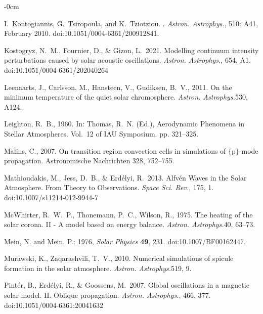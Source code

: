 \documentclass[physics,article,submit,pdftex,moreauthors]{Definitions/mdpi}
\newcommand{\aap}{{\it Astron. Astrophys.}}
\newcommand{\ssr}{{\it Space Sci. Rev.}}
\begin{document}
\begin{adjustwidth}{-\extralength}{0cm}
\begin{thebibliography}{999}
I.~{Kontogiannis}, G.~{Tsiropoula}, and K.~{Tziotziou}.
.
\newblock \emph{\aap}, 510: A41, February 2010.
\newblock doi:10.1051/0004-6361/200912841.

 Kostogryz, N.~M., Fournier, D., \& Gizon, L.\ 2021. {Modelling continuum intensity perturbations caused by solar acoustic oscillations}. \aap, 654, A1. doi:10.1051/0004-6361/202040264



{Leenaarts}, J., {Carlsson}, M., {Hansteen}, V., {Gudiksen}, B.~V., 2011. {On
  the minimum temperature of the quiet solar chromosphere}. \aap 530, A124.


{Leighton}, R.~B., 1960. In: {Thomas}, R.~N. (Ed.), Aerodynamic Phenomena in
  Stellar Atmospheres. Vol.~12 of IAU Symposium. pp. 321--325.

{Malins}, C., 2007. {On transition region convection cells in simulations of
  $\{$p$\}$-mode propagation}. Astronomische Nachrichten 328, 752--755.

 Mathioudakis, M., Jess, D.~B., \& Erd{\'e}lyi, R.\ 2013. {Alfvén Waves in the Solar Atmosphere. From Theory to Observations}. \ssr, 175, 1. doi:10.1007/s11214-012-9944-7




{McWhirter}, R.~W.~P., {Thonemann}, P.~C., {Wilson}, R., 1975. {The heating of
  the solar corona. II - A model based on energy balance}. \aap 40, 63--73.

Mein, N. and Mein, P.: 1976, {\it Solar Physics} {\bf 49}, 231. doi:10.1007/BF00162447.





{Murawski}, K., {Zaqarashvili}, T.~V., 2010. {Numerical simulations of spicule
  formation in the solar atmosphere}. \aap 519, 9.

 Pint{\'e}r, B., Erd{\'e}lyi, R., \& Goossens, M.\ 2007. {Global oscillations in a magnetic solar model. II. Oblique propagation}. \aap, 466, 377. doi:10.1051/0004-6361:20041632


\end{thebibliography}
\end{adjustwidth}
\end{document}
